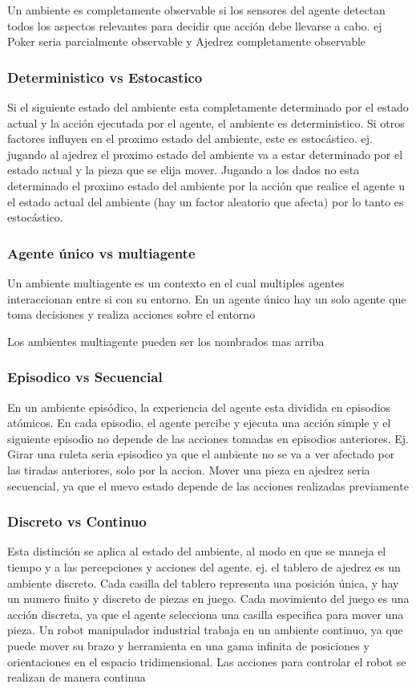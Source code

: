 Un ambiente es completamente observable si los sensores del agente detectan todos los aspectos relevantes para decidir que acción debe llevarse a cabo. ej Poker seria parcialmente observable y Ajedrez completamente observable

\subsubsection*{Deterministico vs Estocastico}

Si el siguiente estado del ambiente esta completamente determinado por el estado actual y la acción ejecutada por el agente, el ambiente es deterministico. Si otros factores influyen en el proximo estado del ambiente, este es estocástico. ej. jugando al ajedrez el proximo estado del ambiente va a estar determinado por el estado actual y la pieza que se elija mover. Jugando a los dados no esta determinado el proximo estado del ambiente por la acción que realice el agente u el estado actual del ambiente (hay un factor aleatorio que afecta) por lo tanto es estocástico.

\subsubsection*{Agente único vs multiagente}

Un ambiente multiagente es un contexto en el cual multiples agentes interaccionan entre si con su entorno. En un agente único hay un solo agente que toma decisiones y realiza acciones sobre el entorno 

Los ambientes multiagente pueden ser los nombrados mas arriba

\subsubsection*{Episodico vs Secuencial}
En un ambiente episódico, la experiencia del agente esta dividida en episodios atómicos. En cada episodio, el agente percibe y ejecuta una acción simple y el siguiente episodio no depende de las acciones tomadas en episodios anteriores. Ej. Girar una ruleta seria episodico ya que el ambiente no se va a ver afectado por las tiradas anteriores, solo por la accion. Mover una pieza en ajedrez seria secuencial, ya que el nuevo estado depende de las acciones realizadas previamente

\subsubsection*{Discreto vs Continuo}
Esta distinción se aplica al estado del ambiente, al modo en que se maneja el tiempo y a las percepciones y acciones del agente. ej. el tablero de ajedrez es un ambiente discreto. Cada casilla del tablero representa una posición única, y hay un numero finito y discreto de piezas en juego. Cada movimiento del juego es una acción discreta, ya que el agente selecciona una casilla especifica para mover una pieza. Un robot manipulador industrial trabaja en un ambiente continuo, ya que puede mover su brazo y herramienta en una gama infinita de posiciones y orientaciones en el espacio tridimensional. Las acciones para controlar el robot se realizan de manera continua

